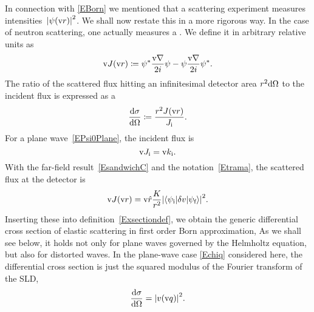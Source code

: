 In connection with \cref{EBorn} we mentioned
that a scattering experiment measures intensities~${|\psi(\text{v}{r})|}^2$.
We shall now restate this in a more rigorous way.
In the case of neutron scattering,
one actually measures a .
We define it in arbitrary relative units as
\begin{equation}\label{EdefJ}
  \text{v}{J}(\text{v}{r}) \coloneqq  \psi^*\frac{\text{v}{\nabla}}{2i}\psi - \psi\frac{\text{v}{\nabla}}{2i}\psi^*.
\end{equation}
%
%
The ratio of the scattered flux hitting an infinitesimal detector area
$r^2\mathrm d\Omega$ to the incident flux is expressed as a
%
%
%
%
\begin{equation}\label{Exsectiondef}
  \frac{\mathrm d\sigma}{\mathrm d\Omega}
  \coloneqq  \frac{r^2 J(\text{v}{r})}{J_{\text{i}}}.
\end{equation}
%
%
For a plane wave~\cref{EPsi0Plane}, the incident flux is
%
%
\begin{equation}\label{EJi}
  \text{v}{J}_{\text{i}} = \text{v}{k}_{\text{i}}.
\end{equation}
With the far-field result~\cref{EsandwichC}
and the notation~\cref{Etrama},
the scattered flux at the detector is
\begin{equation}\label{EJr}
  \text{v}{J}(\text{v}{r})
  = \text{v}{\hat r}\frac{K}{r^2}
    {\left|\left\langle\psi_{\text{i}}|\delta v|\psi_{\text{f}}\right\rangle\right|}^2.
\end{equation}
Inserting these into definition~\cref{Exsectiondef},
we obtain the generic differential cross section
of elastic scattering in first order Born approximation,
%
%
%
%
As we shall see below,
it holds not only for plane waves governed
by the Helmholtz equation,
but also for distorted waves.
%
In the plane-wave case \cref{Echiq} considered here,
the differential cross section is just the squared modulus
of the Fourier transform of the SLD,
%
\begin{equation}\label{Ecross1}
  \frac{\mathrm d\sigma}{\mathrm d\Omega}
  = {\left| v(\text{v}{q}) \right|}^2.
\end{equation}

